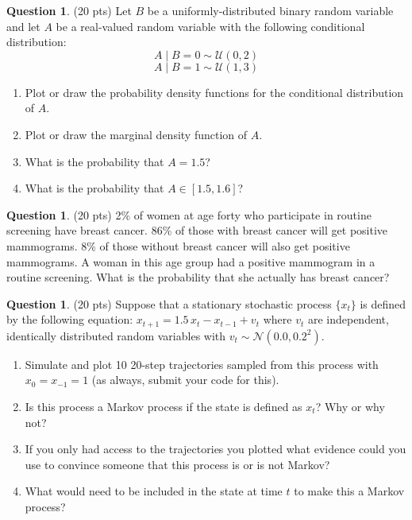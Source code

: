 \documentclass{article}
\theoremstyle{definition}
\newtheorem{question}[thm]{Question}
\begin{document}
\begin{question} (20 pts)
    Let $B$ be a uniformly-distributed binary random variable and let $A$ be a real-valued random variable with the following conditional distribution:
    $$A \mid B=0 \sim \mathcal{U}(0,2)$$
    $$A \mid B=1 \sim \mathcal{U}(1,3)$$
    \begin{enumerate}[nosep,label=(\alph*)]
        \item Plot or draw the probability density functions for the conditional distribution of $A$.
        \item Plot or draw the marginal density function of $A$.
        \item What is the probability that $A=1.5$?
        \item What is the probability that $A \in [1.5, 1.6]$?
    \end{enumerate}
\end{question}

\begin{question} (20 pts)
    2\% of women at age forty who participate in routine screening have breast cancer. 86\% of those with breast cancer will get positive mammograms. 8\% of those without breast cancer will also get positive mammograms. A woman in this age group had a positive mammogram in a routine screening. What is the probability that she actually has breast cancer?
\end{question}

\begin{question} (20 pts)
Suppose that a stationary stochastic process $\{x_t\}$ is defined by the following equation: $x_{t+1} = 1.5 \, x_t - x_{t-1} + v_{t}$ where $v_t$ are independent, identically distributed random variables with $v_t \sim \mathcal{N}(0.0, 0.2^2)$.
    \begin{enumerate}[nosep,label=(\alph*)]
        \item Simulate and plot 10 20-step trajectories sampled from this process with $x_0 = x_{-1} = 1$ (as always, submit your code for this).
        \item Is this process a Markov process if the state is defined as $x_t$? Why or why not?
        \item If you only had access to the trajectories you plotted what evidence could you use to convince someone that this process is or is not Markov?
        \item What would need to be included in the state at time $t$ to make this a Markov process?
    \end{enumerate}
\end{question}
\end{document}
